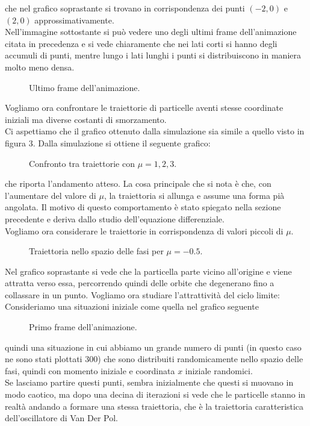 \documentclass[12pt]{article}
\begin{document}
che nel grafico soprastante si trovano in corrispondenza dei punti $(-2,0)$ e $(2,0)$ approssimativamente. \\
Nell'immagine sottostante si può vedere uno degli ultimi frame dell'animazione citata in precedenza e si vede chiaramente che nei lati corti si hanno degli accumuli di punti, mentre lungo i lati lunghi i punti si distribuiscono in maniera molto meno densa. 
\begin{figure}[H]
	\centering
	\scalebox{0.7}{}
	\caption{Ultimo frame dell'animazione. }
\end{figure}
Vogliamo ora confrontare le traiettorie di particelle aventi stesse coordinate iniziali ma diverse costanti di smorzamento. \\
Ci aspettiamo che il grafico ottenuto dalla simulazione sia simile a quello visto in figura 3. Dalla simulazione si ottiene il seguente grafico: 
\begin{figure}[H]
	\centering
	\scalebox{0.7}{}
	\caption{Confronto tra traiettorie con $\mu=1,2,3$.}
\end{figure}
che riporta l'andamento atteso. La cosa principale che si nota è che, con l'aumentare del valore di $\mu$, la traiettoria si allunga e assume una forma pià angolata. Il motivo di questo comportamento è stato spiegato nella sezione precedente e deriva dallo studio dell'equazione differenziale. \\
Vogliamo ora considerare le traiettorie in corrispondenza di valori piccoli di $\mu$. 
\begin{figure}[H]
	\centering
	\scalebox{0.75}{}
	\caption{Traiettoria nello spazio delle fasi per $\mu = -0.5$.}
\end{figure}
Nel grafico soprastante si vede che la particella parte vicino all'origine e viene attratta verso essa, percorrendo quindi delle orbite che degenerano fino a collassare in un punto.
Vogliamo ora studiare l'attrattività del ciclo limite: Consideriamo una situazioni iniziale come quella nel grafico seguente
\begin{figure}[H]
	\centering
	\scalebox{0.75}{}
	\caption{Primo frame dell'animazione.}
\end{figure}
quindi una situazione in cui abbiamo un grande numero di punti (in questo caso ne sono stati plottati 300) che sono distribuiti randomicamente nello spazio delle fasi, quindi con momento iniziale e coordinata $x$ iniziale randomici. \\
Se lasciamo partire questi punti, sembra inizialmente che questi si muovano in modo caotico, ma dopo una decina di iterazioni si vede che le particelle stanno in realtà andando a formare una stessa traiettoria, che è la traiettoria caratteristica dell'oscillatore di Van Der Pol. \\
\end{document}

